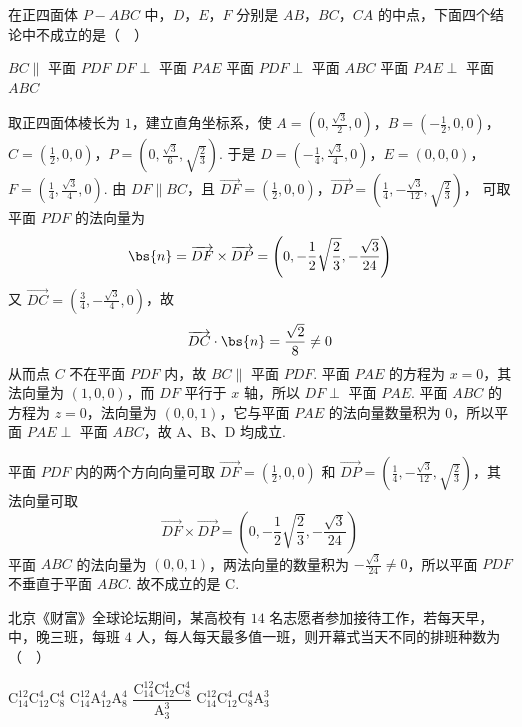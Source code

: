 \begin{problem}
在正四面体 \(P-ABC\) 中，\(D\)，\(E\)，\(F\) 分别是 \(AB\)，\(BC\)，\(CA\) 的中点，下面四个结论中不成立的是（\(\quad\)）

\choices
    {\(BC\parallel\) 平面 \(PDF\)}
    {\(DF\perp\) 平面 \(PAE\)}
    {平面 \(PDF\perp\) 平面 \(ABC\)}
    {平面 \(PAE\perp\) 平面 \(ABC\)}
\end{problem}

\begin{solution}
取正四面体棱长为 \(1\)，建立直角坐标系，使
\(A=\left(0,\frac{\sqrt3}{2},0\right)\)，\(B=\left(-\frac12,0,0\right)\)，\(C=\left(\frac12,0,0\right)\)，\(P=\left(0,\frac{\sqrt3}{6},\sqrt{\frac23}\right)\).
于是 \(D=\left(-\frac14,\frac{\sqrt3}{4},0\right)\)，\(E=(0,0,0)\)，\(F=\left(\frac14,\frac{\sqrt3}{4},0\right)\).
由 \(DF\parallel BC\)，且 \(\overrightarrow{DF}=\left(\frac12,0,0\right)\)，\(\overrightarrow{DP}=\left(\frac14,-\frac{\sqrt3}{12},\sqrt{\frac23}\right)\)，
可取平面 \(PDF\) 的法向量为
\[
\bs{n}=\overrightarrow{DF}\times\overrightarrow{DP}
=\left(0,-\frac12\sqrt{\frac23},-\frac{\sqrt3}{24}\right)
\]
又 \(\overrightarrow{DC}=\left(\frac34,-\frac{\sqrt3}{4},0\right)\)，故
\[
\overrightarrow{DC}\cdot\bs{n}=\frac{\sqrt2}{8}\ne0
\]
从而点 \(C\) 不在平面 \(PDF\) 内，故 \(BC\parallel\) 平面 \(PDF\). 平面 \(PAE\) 的方程为 \(x=0\)，其法向量为 \(\left(1,0,0\right)\)，而 \(DF\) 平行于 \(x\) 轴，所以 \(DF\perp\) 平面 \(PAE\). 平面 \(ABC\) 的方程为 \(z=0\)，法向量为 \(\left(0,0,1\right)\)，它与平面 \(PAE\) 的法向量数量积为 \(0\)，所以平面 \(PAE\perp\) 平面 \(ABC\)，故 A、B、D 均成立.

平面 \(PDF\) 内的两个方向向量可取 \(\overrightarrow{DF}=\left(\frac12,0,0\right)\) 和 \(\overrightarrow{DP}=\left(\frac14,-\frac{\sqrt3}{12},\sqrt{\frac23}\right)\)，其法向量可取
\[
\overrightarrow{DF}\times\overrightarrow{DP}=\left(0,-\frac12\sqrt{\frac23},-\frac{\sqrt3}{24}\right)
\]
平面 \(ABC\) 的法向量为 \(\left(0,0,1\right)\)，两法向量的数量积为 \(-\frac{\sqrt3}{24}\ne0\)，所以平面 \(PDF\) 不垂直于平面 \(ABC\). 故不成立的是 C.
\end{solution}

\begin{problem}
北京《财富》全球论坛期间，某高校有 \(14\) 名志愿者参加接待工作，若每天早，中，晚三班，每班 \(4\) 人，每人每天最多值一班，则开幕式当天不同的排班种数为（\(\quad\)）

\choices
    {\(\mathrm C_{14}^{12}\mathrm C_{12}^{4}\mathrm C_{8}^{4}\)}
    {\(\mathrm C_{14}^{12}\mathrm A_{12}^{4}\mathrm A_{8}^{4}\)}
    {\(\dfrac{\mathrm C_{14}^{12}\mathrm C_{12}^{4}\mathrm C_{8}^{4}}{\mathrm A_{3}^{3}}\)}
    {\(\mathrm C_{14}^{12}\mathrm C_{12}^{4}\mathrm C_{8}^{4}\mathrm A_{3}^{3}\)}
\end{problem}

